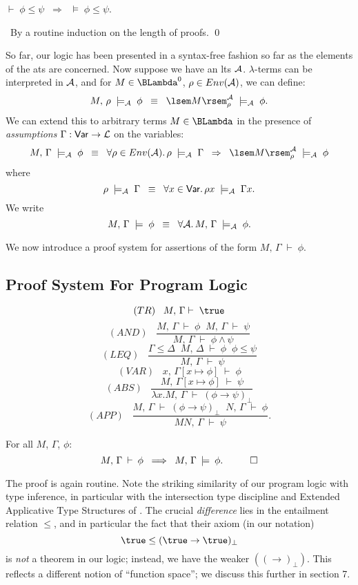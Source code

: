 \begin{theorem}
\label{lsoun}
$\vdash \; \phi \leq \psi \;\; \Longrightarrow \;\; \models \; \phi \leq \psi$.
\end{theorem}

\proof\ By a routine induction on the length of proofs. \qed

So far, our logic has been presented in a syntax-free fashion so far as the elements of the ats are concerned. Now suppose we have an lts ${\cal A}$. $\lambda$-terms can be interpreted in $\cal A$, and for $M \in \BLambda^{0}$, $\rho \in Env(\cal A )$, we can define:
\[ M, \, \rho \; \models_{\cal A} \; \phi \;\; \equiv \;\; \lsem M \rsem^{\cal A}_{\rho} \; \models_{\cal A} \; \phi . \]
We can extend this to arbitrary terms $M \in \BLambda$ in the presence of {\em assumptions} $\Gamma :  {\sf Var} \rightarrow {\cal L}$ on the variables:
\[ M, \, \Gamma \; \models_{\cal A} \; \phi \;\; \equiv \;\; \forall \rho \in Env({\cal A}). \, \rho \; \models_{\cal A} \; \Gamma \;\; \Rightarrow \;\; \lsem M \rsem^{\cal A}_{\rho} \; \models_{\cal A} \; \phi  \]
where
\[ \rho \; \models_{\cal A} \; \Gamma \;\; \equiv \;\; \forall x \in {\sf Var}. \, \rho x \; \models_{\cal A} \; \Gamma x . \]
We write
\[ M, \, \Gamma \; \models \; \phi \;\; \equiv \;\; \forall {\cal A} . \, M, \, \Gamma \; \models_{\cal A} \; \phi . \]

We now introduce a proof system for assertions of the form $M, \, \Gamma \; \vdash \; \phi$.
\subsection*{Proof System For Program Logic}
\[ (TR) \;\;\; M, \, \Gamma \vdash \; \true \]
\[ (AND) \;\;\; \frac{M, \, \Gamma \; \vdash \; \phi \;\; M, \, \Gamma \; \vdash \; \psi}{M, \, \Gamma \; \vdash \; \phi \wedge \psi} \]
\[ (LEQ) \;\;\; \frac{\Gamma \leq \Delta \;\; M, \, \Delta \; \vdash \; \phi \;\; \phi \leq \psi}{M, \, \Gamma \; \vdash \; \psi} \]
\[ (VAR) \;\;\; x, \, \Gamma [ x \mapsto \phi ] \; \vdash \; \phi \]
\[ (ABS) \;\;\; \frac{M, \, \Gamma [ x \mapsto \phi ] \; \vdash \; \psi}{\lambda x . M, \, \Gamma \; \vdash \; (\phi \rightarrow \psi )_{\bot}} \]
\[ (APP) \;\;\; \frac{M, \, \Gamma \; \vdash \; ( \phi \rightarrow \psi )_{\bot} \;\; N, \, \Gamma \; \vdash \; \phi}{MN, \, \Gamma \; \vdash \; \psi} . \]
\begin{theorem}
For all $M$, $\Gamma$, $\phi$:
\[ M, \, \Gamma \: \vdash \: \phi \;\; \Longrightarrow \;\; M, \, \Gamma \: 
\models \: \phi . \;\;\; \qed \]
\end{theorem}
The proof is again routine. 
Note the striking similarity of our program logic with type inference, in particular with the intersection type discipline and Extended Applicative Type Structures of \cite{CDHL84}. 
The crucial {\em difference} lies in the entailment relation $\leq$, and in particular the fact that their axiom (in our notation)
\[ \true \leq (\true \rightarrow \true )_{\bot} \]
is {\em not} a theorem in our logic; instead, we have the weaker $((\rightarrow )_{\bot})$. This reflects a different notion of ``function space''; we discuss this further in section 7.

